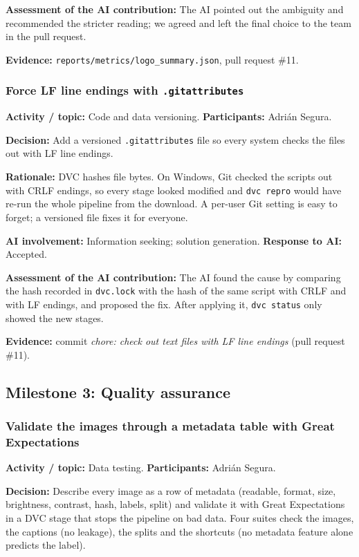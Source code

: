 \documentclass[11pt]{article}
\begin{document}
\noindent\textbf{Assessment of the AI contribution:} The AI pointed out the ambiguity and recommended the stricter reading; we agreed and left the final choice to the team in the pull request.

\noindent\textbf{Evidence:} \texttt{reports/metrics/logo\_summary.json}, pull request \#11.

\subsubsection{Force LF line endings with \texttt{.gitattributes}}
\noindent\textbf{Activity / topic:} Code and data versioning. \textbf{Participants:} Adri\'an Segura.

\noindent\textbf{Decision:} Add a versioned \texttt{.gitattributes} file so every system checks the files out with LF line endings.

\noindent\textbf{Rationale:} DVC hashes file bytes. On Windows, Git checked the scripts out with CRLF endings, so every stage looked modified and \texttt{dvc repro} would have re-run the whole pipeline from the download. A per-user Git setting is easy to forget; a versioned file fixes it for everyone.

\noindent\textbf{AI involvement:} Information seeking; solution generation. \textbf{Response to AI:} Accepted.

\noindent\textbf{Assessment of the AI contribution:} The AI found the cause by comparing the hash recorded in \texttt{dvc.lock} with the hash of the same script with CRLF and with LF endings, and proposed the fix. After applying it, \texttt{dvc status} only showed the new stages.

\noindent\textbf{Evidence:} commit \emph{chore: check out text files with LF line endings} (pull request \#11).

\subsection{Milestone 3: Quality assurance}

\subsubsection{Validate the images through a metadata table with Great Expectations}
\noindent\textbf{Activity / topic:} Data testing. \textbf{Participants:} Adri\'an Segura.

\noindent\textbf{Decision:} Describe every image as a row of metadata (readable, format, size, brightness, contrast, hash, labels, split) and validate it with Great Expectations in a DVC stage that stops the pipeline on bad data. Four suites check the images, the captions (no leakage), the splits and the shortcuts (no metadata feature alone predicts the label).
\end{document}
